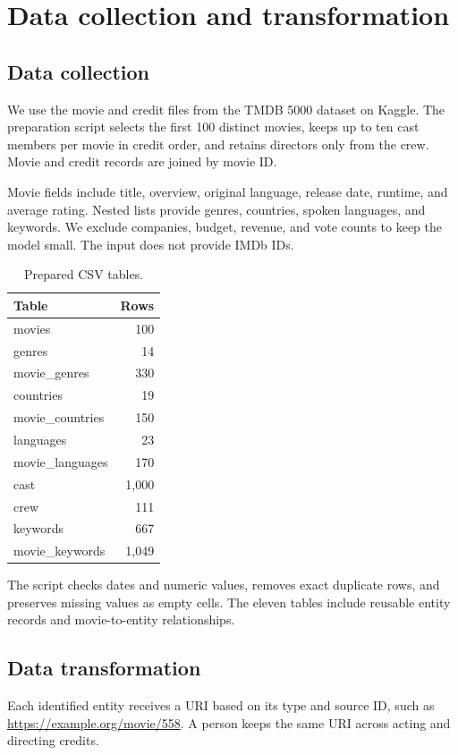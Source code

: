 \section{Data collection and transformation}\label{sec:data}
\subsection{Data collection}
We use the movie and credit files from the TMDB 5000 dataset on Kaggle. The preparation script selects the first 100 distinct movies, keeps up to ten cast members per movie in credit order, and retains directors only from the crew. Movie and credit records are joined by movie ID.

Movie fields include title, overview, original language, release date, runtime, and average rating. Nested lists provide genres, countries, spoken languages, and keywords. We exclude companies, budget, revenue, and vote counts to keep the model small. The input does not provide IMDb IDs.

\begin{table}[t]
\caption{Prepared CSV tables.}
\centering\small
\begin{tabular}{lr}
\toprule Table & Rows\\\midrule
movies & 100\\
genres & 14\\
movie\_genres & 330\\
countries & 19\\
movie\_countries & 150\\
languages & 23\\
movie\_languages & 170\\
cast & 1,000\\
crew & 111\\
keywords & 667\\
movie\_keywords & 1,049\\
\bottomrule\end{tabular}
\end{table}

The script checks dates and numeric values, removes exact duplicate rows, and preserves missing values as empty cells. The eleven tables include reusable entity records and movie-to-entity relationships.

\subsection{Data transformation}
Each identified entity receives a URI based on its type and source ID, such as \url{https://example.org/movie/558}. A person keeps the same URI across acting and directing credits.

